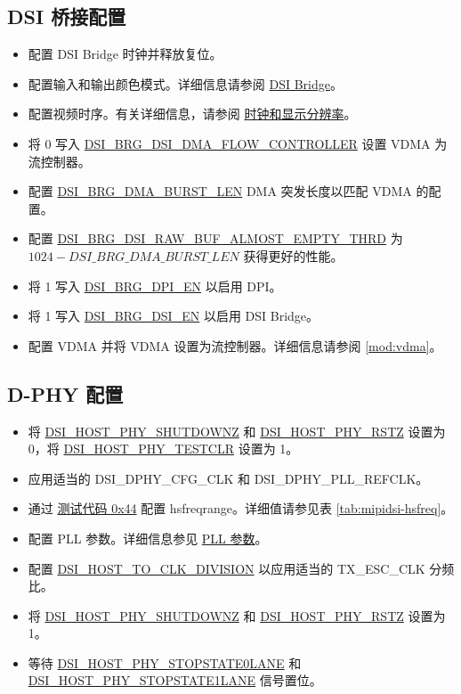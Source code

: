 \documentclass[main\_\_CN.tex]{subfiles}
\begin{document}
\subsection{DSI 桥接配置}
\label{sec:dsi-bridge-configuration}
\begin{itemize}
    \item 配置 DSI Bridge 时钟并释放复位。
    \item 配置输入和输出颜色模式。详细信息请参阅 \hyperref[sec:dsi-bridge]{DSI Bridge}。
    \item 配置视频时序。有关详细信息，请参阅 \hyperref[sec:clocks-and-display-resolution]{时钟和显示分辨率}。
    \item 将 0 写入 \hyperref[fielddesc:DSIBRGDSIDMAFLOWCONTROLLER]{DSI\_BRG\_DSI\_DMA\_FLOW\_CONTROLLER} 设置 VDMA 为流控制器。
    \item 配置 \hyperref[fielddesc:DSIBRGDMABURSTLEN]{DSI\_BRG\_DMA\_BURST\_LEN} DMA 突发长度以匹配 VDMA 的配置。
    \item 配置 \hyperref[fielddesc:DSIBRGDSIRAWBUFALMOSTEMPTYTHRD]{DSI\_BRG\_DSI\_RAW\_BUF\_ALMOST\_EMPTY\_THRD} 为 $1024 - \hyperref[fielddesc:DSIBRGDMABURSTLEN]{DSI\_BRG\_DMA\_BURST\_LEN}$ 获得更好的性能。
    \item 将 1 写入 \hyperref[fielddesc:DSIBRGDPIEN]{DSI\_BRG\_DPI\_EN} 以启用 DPI。
    \item 将 1 写入 \hyperref[fielddesc:DSIBRGDSIEN]{DSI\_BRG\_DSI\_EN} 以启用 DSI Bridge。
    \item 配置 VDMA 并将 VDMA 设置为流控制器。详细信息请参阅 \ref{mod:vdma}。
\end{itemize}
\label{sec:mipidsi-dsi-bridge-programming-proc}

\subsection{D-PHY 配置}
\label{sec:mipidsi-dsi-dphy-programming-proc}
\begin{itemize}
    \item 将 \hyperref[fielddesc:DSIHOSTPHYSHUTDOWNZ]{DSI\_HOST\_PHY\_SHUTDOWNZ} 和 \hyperref[fielddesc:DSIHOSTPHYRSTZ]{DSI\_HOST\_PHY\_RSTZ} 设置为 0，将 \hyperref[fielddesc:DSIHOSTPHYTESTCLR]{DSI\_HOST\_PHY\_TESTCLR} 设置为 1。
    \item 应用适当的 DSI\_DPHY\_CFG\_CLK 和 DSI\_DPHY\_PLL\_REFCLK。
    \item 通过 \hyperref[sec:test-code-0x44]{测试代码 0x44} 配置 hsfreqrange。详细值请参见表 \ref{tab:mipidsi-hsfreq}。
    \item 配置 PLL 参数。详细信息参见 \hyperref[sec:pll-parameters]{PLL 参数}。
    \item 配置 \hyperref[fielddesc:DSIHOSTTOCLKDIVISION]{DSI\_HOST\_TO\_CLK\_DIVISION} 以应用适当的 TX\_ESC\_CLK 分频比。
    \item 将 \hyperref[fielddesc:DSIHOSTPHYSHUTDOWNZ]{DSI\_HOST\_PHY\_SHUTDOWNZ} 和 \hyperref[fielddesc:DSIHOSTPHYRSTZ]{DSI\_HOST\_PHY\_RSTZ} 设置为 1。
    \item 等待 \hyperref[fielddesc:DSIHOSTPHYSTOPSTATE0LANE]{DSI\_HOST\_PHY\_STOPSTATE0LANE} 和 \hyperref[fielddesc:DSIHOSTPHYSTOPSTATE1LANE]{DSI\_HOST\_PHY\_STOPSTATE1LANE} 信号置位。
\end{itemize}
\end{document}
